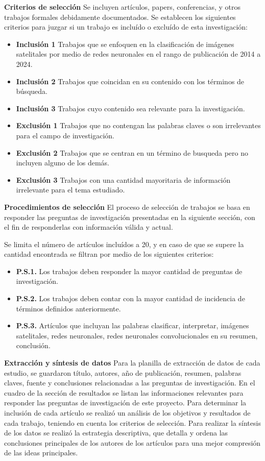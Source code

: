 {\bf Criterios de selección} Se incluyen artículos, papers, conferencias, y otros trabajos formales debidamente
documentados. Se establecen los siguientes criterios para juzgar si un trabajo es incluído o excluído de esta
investigación:
\begin{itemize}
    \item[] {\bf Inclusión 1} Trabajos que se enfoquen en la clasificación de imágenes satelitales por medio de redes
        neuronales en el rango de publicación de 2014 a 2024.
    \item[] {\bf Inclusión 2} Trabajos que coincidan en su contenido con los términos de búsqueda.
    \item[] {\bf Inclusión 3} Trabajos cuyo contenido sea relevante para la investigación.
    \item[] {\bf Exclusión 1} Trabajos que no contengan las palabras claves o son irrelevantes para el campo de
        investigación.
    \item[] {\bf Exclusión 2} Trabajos que se centran en un término de busqueda pero no incluyen alguno de los demás.
    \item[] {\bf Exclusión 3} Trabajos con una cantidad mayoritaria de información irrelevante para el tema estudiado.
\end{itemize}

{\bf Procedimientos de selección} El proceso de selección de trabajos se basa en responder las preguntas de
investigación presentadas en la siguiente sección, con el fin de responderlas con información válida y actual.

Se limita el número de artículos incluídos a 20, y en caso de que se supere la cantidad encontrada se filtran por medio
de los siguientes criterios:

\begin{itemize}
    \item[] {\bf P.S.1.} Los trabajos deben responder la mayor cantidad de preguntas de investigación.
    \item[] {\bf P.S.2.} Los trabajos deben contar con la mayor cantidad de incidencia de términos definidos
        anteriormente.
    \item[] {\bf P.S.3.} Artículos que incluyan las palabras clasificar, interpretar, imágenes satelitales, redes
        neuronales, redes neuronales convolucionales en su resumen, conclusión.
\end{itemize}

{\bf Extracción y síntesis de datos} Para la planilla de extracción de datos de cada estudio, se guardaron título,
autores, año de publicación, resumen, palabras claves, fuente y conclusiones relacionadas a las preguntas de
investigación. En el cuadro de la sección de resultados se listan las informaciones relevantes para responder las
preguntas de investigación de este proyecto. Para determinar la inclusión de cada artículo se realizó un análisis de
los objetivos y resultados de cada trabajo, teniendo en cuenta los criterios de selección. Para realizar la síntesis de
los datos se realizó la estrategia descriptiva, que detalla y ordena las conclusiones principales de los autores de los
artículos para una mejor compresión de las ideas principales.

